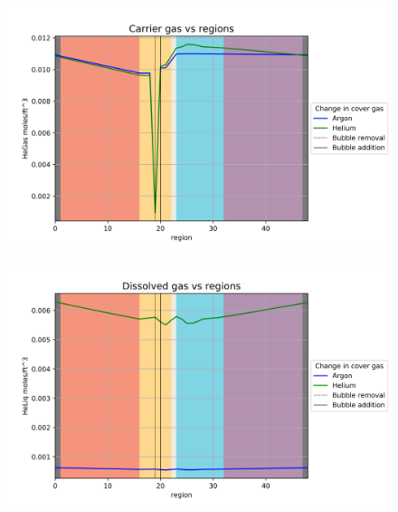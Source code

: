\begin{figure}[p] 
\centering
\begin{minipage}{.5\textwidth}
  \centering
  \includegraphics[width=1.0\linewidth]{images/CoverGasHeGas.png}
  \label{fig:CoverGasHeGas}
\end{minipage}%
\begin{minipage}{.5\textwidth}
  \centering
  \includegraphics[width=1.0\linewidth]{images/CoverGasHeLiq.png}
  \label{fig:CoverGasHeLiq}
\end{minipage}
\end{figure}

